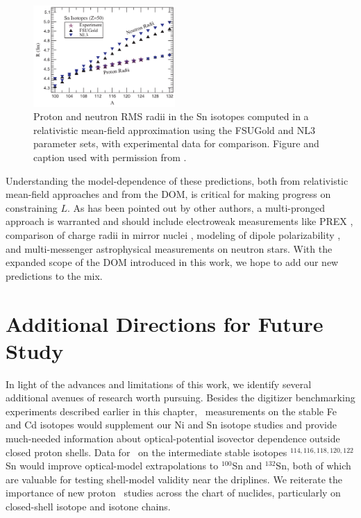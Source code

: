 \begin{figure}
    \centering
    \includegraphics[width=0.48\textwidth]{figures/Piekarewicz2006SnIsotopes.png}
    \caption[Proton and neutron RMS radii in the Sn isotopes computed with FSUGold and NL3
    interactions]
    {
        Proton and neutron RMS radii in the Sn isotopes computed in a relativistic mean-field
        approximation using the FSUGold and NL3 parameter sets, with experimental data for comparison.
        Figure and caption used with permission from \cite{Piekarewicz2006}.
    }
    \label{Piekarewicz2006SnIsotopes}
\end{figure}
Understanding the model-dependence of these predictions, both from relativistic mean-field
approaches and from the DOM, is critical for making progress on constraining
$L$. As has been pointed out by other authors, a multi-pronged approach 
is warranted and should include electroweak measurements like PREX \cite{Horowitz2014}, comparison of
charge radii in mirror nuclei \cite{Brown2017}, modeling of dipole
polarizability \cite{Piekarewicz2006}, and multi-messenger astrophysical
measurements on neutron stars. With the expanded scope of the DOM introduced in
this work, we hope to add our new predictions to the mix.

\section{Additional Directions for Future Study}
In light of the advances and limitations of this work, we identify several
additional avenues of research worth pursuing.
Besides the digitizer benchmarking experiments described earlier
in this chapter, \tot\ measurements on the stable Fe and Cd isotopes would
supplement our Ni and Sn isotope studies and provide much-needed information
about optical-potential isovector dependence outside closed proton shells.
Data for \tot\ on the intermediate stable isotopes $^{114,116,118,120,122}$Sn
would improve optical-model extrapolations to $^{100}$Sn and $^{132}$Sn,
both of which are valuable for testing shell-model validity near the driplines.
We reiterate the importance of new proton \rxn\
studies across the chart of nuclides, particularly on closed-shell isotope and isotone
chains.

